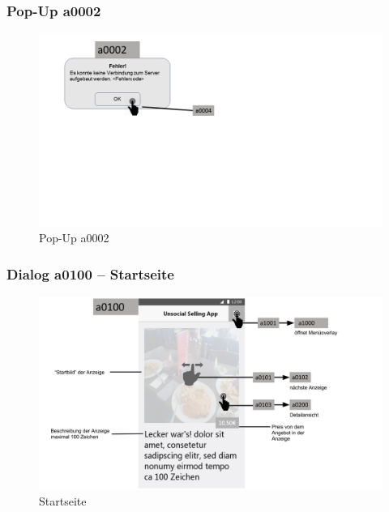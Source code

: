 \documentclass[a4paper,12pt,oneside]{scrartcl}
\begin{document}
\subsubsection{Pop-Up a0002}
\begin{figure}[!htbp]
\centering
\noindent\includegraphics[width=\linewidth,height=\textheight,keepaspectratio]{Dialoge/a0000p}
\caption{Pop-Up a0002}
\end{figure}
\FloatBarrier


\subsubsection{Dialog a0100 – Startseite}
\begin{figure}[!htbp]
\centering
\noindent\includegraphics[width=\linewidth,height=\textheight,keepaspectratio]{Dialoge/a0100}
\caption{Startseite}
\end{figure}
\FloatBarrier
\end{document}
